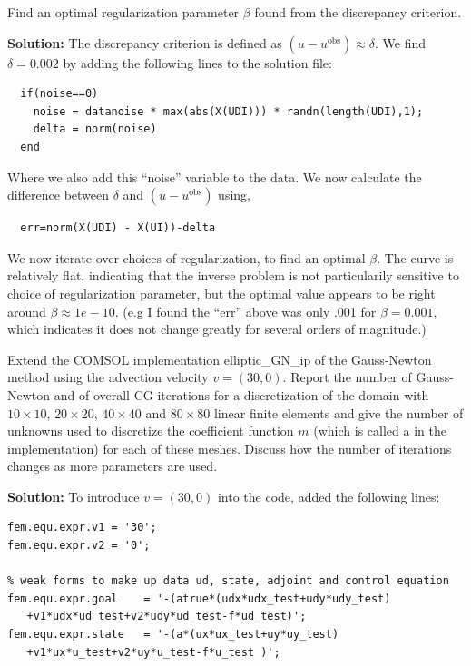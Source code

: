 \documentclass[11pt]{article}
\newenvironment{solution}{\begin{trivlist}\item[]{\bf Solution:}}
                      {\end{trivlist}}
\begin{document}
\begin{enumerate}
\item[(a)]Find an optimal regularization parameter $\beta$ found from the
	  discrepancy criterion.

\begin{solution}
The discrepancy criterion is defined as $(u-u^{\text{obs}}) \approx
 \delta$. We find $\delta = 0.002$ by adding the following lines to the
 solution file: 
 \begin{lstlisting}
  if(noise==0)
    noise = datanoise * max(abs(X(UDI))) * randn(length(UDI),1);
    delta = norm(noise)
  end
 \end{lstlisting}
 Where we also add this ``noise'' variable to the data. We now calculate
 the difference between $\delta$ and $(u-u^{\text{obs}})$ using, 
 \begin{lstlisting}
  err=norm(X(UDI) - X(UI))-delta
 \end{lstlisting}
We now iterate over choices of regularization, to find an optimal
 $\beta$. The curve is relatively flat, indicating that the inverse
 problem is not particularily sensitive to choice of regularization
 parameter, but the optimal value appears to be right around $\beta
 \approx 1e-10$. (e.g I found the ``err'' above was only .001 for $\beta
 = 0.001$, which indicates it does not change greatly for several orders
 of magnitude.)
 
\end{solution}


\item[(b)]Extend the COMSOL implementation elliptic\_GN\_ip of the
	  Gauss-Newton method using the advection velocity
	  $v=(30,0)$. Report the number of Gauss-Newton and of overall
	  CG iterations for a discretization of the domain with $10
	  \times 10$, $20 \times 20$, $40 \times 40$ and $80 \times 80$
	  linear finite elements and give the number of unknowns used to
	  discretize the coefficient function $m$ (which is called a in
	  the implementation) for each of these meshes. Discuss how the
	  number of iterations changes as more parameters are used. 

\begin{solution}
To introduce $v=(30,0)$ into the code, added the following lines:
\begin{lstlisting}
fem.equ.expr.v1 = '30';
fem.equ.expr.v2 = '0';

% weak forms to make up data ud, state, adjoint and control equation
fem.equ.expr.goal    = '-(atrue*(udx*udx_test+udy*udy_test)
   +v1*udx*ud_test+v2*udy*ud_test-f*ud_test)';
fem.equ.expr.state   = '-(a*(ux*ux_test+uy*uy_test)
   +v1*ux*u_test+v2*uy*u_test-f*u_test )';


\end{lstlisting}
\end{solution}
\end{enumerate}
\end{document}
